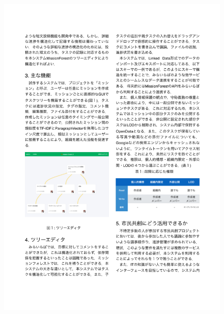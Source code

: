 \begin{figure}[ht]
    \begin{center}
        \includegraphics[width=1.0\linewidth]{assets/pdf/sig_cci2016_2.pdf}
    \end{center}
\end{figure}
